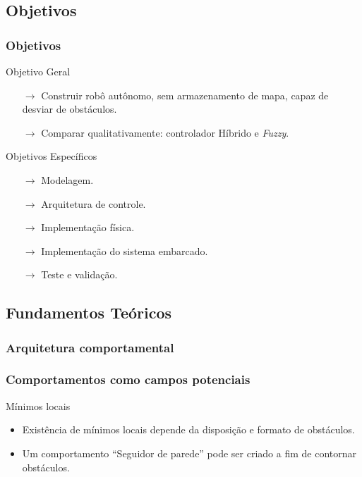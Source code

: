 \documentclass[hyperref={pdfpagelabels=false},table]{beamer}
\begin{document}
\subsection{Objetivos}
\begin{frame}
	\frametitle{Objetivos}
	\begin{exampleblock}{Objetivo Geral}
		\begin{itemize}
		  \item[$\rightarrow$] Construir robô autônomo, sem armazenamento de mapa,
		  capaz de desviar de obstáculos.
		  \item[$\rightarrow$] Comparar qualitativamente: controlador Híbrido e
		  \textit{Fuzzy}.
		\end{itemize}
	\end{exampleblock}
	\pause
	\begin{block}{Objetivos Específicos}
		\begin{itemize}
		  \item[$\rightarrow$] Modelagem.
		  \item[$\rightarrow$] Arquitetura de controle.
		  \item[$\rightarrow$] Implementação física.
		  \item[$\rightarrow$] Implementação do sistema embarcado.
		  \item[$\rightarrow$] Teste e validação.
		\end{itemize}
	\end{block}
\end{frame}
	
\subsection{Fundamentos Teóricos}
\begin{frame}
	\frametitle{Arquitetura comportamental}
	
\end{frame}

\begin{frame}
	\frametitle{Comportamentos como campos potenciais}
	
\end{frame}

\begin{frame}
	\begin{block}{Mínimos locais}
		\begin{itemize}
		  \item Existência de mínimos locais depende da disposição e formato de
		  obstáculos.
		  \item Um comportamento ``Seguidor de parede'' pode ser criado a fim de
		  contornar obstáculos.
		\end{itemize}
	\end{block}
\end{frame}
\end{document}
